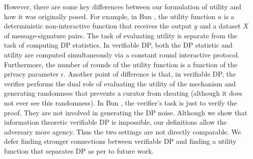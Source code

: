  However, there are some key differences between our formulation of utility and how it was originally posed.
 For example, in Bun \etal, the utility function $u$ is a deterministic non-interactive function that receives the output $y$ and a dataset $X$ of message-signature pairs. The task of evaluating utility is separate from the task of computing DP statistics.
 In verifiable DP, both the DP statistic and utility are computed simultaneously via a constant round interactive protocol. 
 Furthermore, the number of rounds of the utility function is a function of the privacy parameter $\epsilon$. 
 Another point of difference is that, in verifiable DP, the verifier performs the dual role of evaluating the utility of the mechanism and generating randomness that prevents a curator from cheating (although it does not ever see this randomness). In Bun \etal, the verifier's task is just to verify the proof. 
 They are not involved in generating the DP noise.
 Although we show that information theoretic verifiable DP is impossible, our definitions allow the adversary more agency. Thus the two settings are not directly comparable. 
 We defer finding stronger connections between verifiable DP and finding a utility function that separates DP as per  \cite{vadhan2017complexity} to future work.

